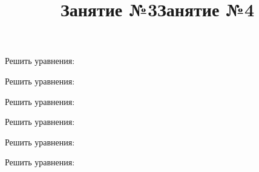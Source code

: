 \title{Занятие №3}
\begin{listofex}
	\item Решить уравнения:
	\begin{enumcols}[itemcolumns=2]
		\item {}
		\item {}
		\item {}
		\item {}
		\item {}
		\item {}
	\end{enumcols}
	\item Решить уравнения:
	\begin{enumcols}[itemcolumns=2]
		\item {}
		\item {}
		\item {}
		\item {}
	\end{enumcols}
	\item {}
	\item Решить уравнения:
	\begin{enumcols}[itemcolumns=2]
		\item {}
		\item {}
		\item {}
		\item {}
	\end{enumcols}
\end{listofex}
\newpage
\title{Занятие №4}
\begin{listofex}
	\item Решить уравнения:
	\begin{enumcols}[itemcolumns=2]
		\item {}
		\item {}
		\item {}
		\item {}
		\item {}
		\item {}
	\end{enumcols}
	\item Решить уравнения:
	\begin{enumcols}[itemcolumns=2]
		\item {}
		\item {}
		\item {}
		\item {}
	\end{enumcols}
	\item {}
	\item Решить уравнения:
	\begin{enumcols}[itemcolumns=2]
		\item {}
		\item {}
		\item {}
		\item {}
	\end{enumcols}
\end{listofex}
